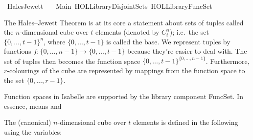 %
\begin{isabellebody}%
%
%
\isadelimtheory
%
\endisadelimtheory
%
\isatagtheory
{}\isamarkupfalse%
\ {\isachardoublequoteopen}Hales{\isacharunderscore}{\kern0pt}Jewett{\isachardoublequoteclose}\isanewline
\ \ \ Main\ {\isachardoublequoteopen}HOL{\isacharminus}{\kern0pt}Library{\isachardot}{\kern0pt}Disjoint{\isacharunderscore}{\kern0pt}Sets{\isachardoublequoteclose}\ {\isachardoublequoteopen}HOL{\isacharminus}{\kern0pt}Library{\isachardot}{\kern0pt}FuncSet{\isachardoublequoteclose}\isanewline
{}%
\endisatagtheory
{\isafoldtheory}%
%
\isadelimtheory
%
\endisadelimtheory
%
\isadelimdocument
%
\endisadelimdocument
%
\isatagdocument
%
\isamarkuptrue%
%
\endisatagdocument
{\isafolddocument}%
%
\isadelimdocument
%
\endisadelimdocument
%
\begin{isamarkuptext}%
The Hales--Jewett Theorem is at its core a statement about sets of tuples called the
$n$-dimensional cube over $t$ elements (denoted by $C^n_t$); i.e.\ the set $\{0,\ldots,t - 1\}^n$, where 
$\{0,\ldots,t - 1\}$ is called the base. 
  We represent tuples by functions $f : \{0,\ldots,n - 1\} \rightarrow \{0,\ldots,t - 1\}$ because
they're easier to deal with. The set of tuples then becomes the function space 
$\{0,\ldots,t - 1\}^{\{0,\ldots,n - 1\}}$.
  Furthermore, $r$-colourings of the cube are represented by mappings from the function space to the
set $\{0,\ldots, r-1\}$.%
\end{isamarkuptext}\isamarkuptrue%
%
\isadelimdocument
%
\endisadelimdocument
%
\isatagdocument
%
\isamarkuptrue%
%
\endisatagdocument
{\isafolddocument}%
%
\isadelimdocument
%
\endisadelimdocument
%
\begin{isamarkuptext}%
Function spaces in Isabelle are supported by the library component FuncSet.
  In essence,  means  and %
\end{isamarkuptext}\isamarkuptrue%
%
\begin{isamarkuptext}%
The (canonical) $n$-dimensional cube over $t$ elements is defined in the following using the variables:


\end{isamarkuptext}
\end{isabellebody}
